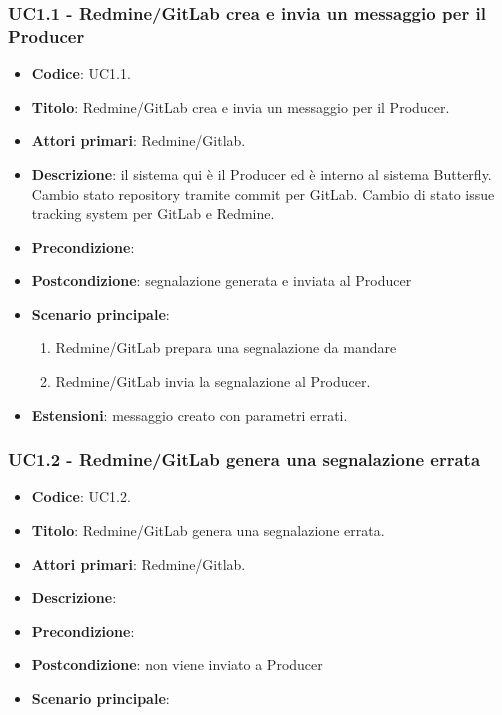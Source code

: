 \subsubsection{UC1.1 - Redmine/GitLab crea e invia un messaggio per il Producer}
	\begin{itemize}
		\item \textbf{Codice}: UC1.1.
		\item \textbf{Titolo}: Redmine/GitLab crea e invia un messaggio per il Producer.
		\item \textbf{Attori primari}: Redmine/Gitlab.
		\item \textbf{Descrizione}:
		il sistema qui è il Producer ed è interno al sistema Butterfly. Cambio stato repository tramite commit per GitLab. Cambio di stato issue tracking system per GitLab e Redmine.
		\item \textbf{Precondizione}: 
		\item \textbf{Postcondizione}: segnalazione generata e inviata al Producer
		\item \textbf{Scenario principale}: 
		\begin{enumerate}
			\item Redmine/GitLab prepara una segnalazione da mandare
			\item Redmine/GitLab invia la segnalazione al Producer.
		\end{enumerate}
		\item \textbf{Estensioni}: messaggio creato con parametri errati.
	\end{itemize}
	

\subsubsection{UC1.2 - Redmine/GitLab genera una segnalazione errata}
	\begin{itemize}
		\item \textbf{Codice}: UC1.2.
		\item \textbf{Titolo}: Redmine/GitLab genera una segnalazione errata.
		\item \textbf{Attori primari}: Redmine/Gitlab.
		\item \textbf{Descrizione}:
		\item \textbf{Precondizione}:
		\item \textbf{Postcondizione}: non viene inviato a Producer
		\item \textbf{Scenario principale}: 
	\end{itemize}

